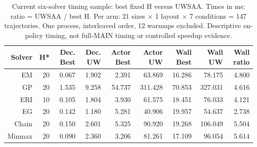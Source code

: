 \begin{table}[t]
\centering\scriptsize
\caption{Current six-solver timing sample: best fixed H versus UWSAA. Times in ms; ratio = UWSAA / best H. Per arm: 21 sizes $\times$ 1 layout $\times$ 7 conditions = 147 trajectories. One process, interleaved order, 12 warmups excluded. Descriptive on-policy timing, not full-MAIN timing or controlled speedup evidence.}
\setlength{\tabcolsep}{4pt}
\begin{tabular}{rrrrrrrrr}
\toprule
Solver & H* & Dec. Best & Dec. UW & Actor Best & Actor UW & Wall Best & Wall UW & Wall ratio \\
\midrule
EM & 20 & 0.067 & 1.902 & 2.391 & 63.869 & 16.286 & 78.175 & 4.800 \\
GP & 20 & 1.535 & 9.258 & 54.737 & 311.428 & 70.853 & 327.031 & 4.616 \\
ERI & 10 & 0.105 & 1.804 & 3.930 & 61.575 & 18.451 & 76.033 & 4.121 \\
EG & 20 & 0.142 & 1.180 & 5.281 & 40.906 & 19.957 & 54.637 & 2.738 \\
Chain & 20 & 0.150 & 2.601 & 5.325 & 90.920 & 19.268 & 106.049 & 5.504 \\
Minmax & 20 & 0.090 & 2.360 & 3.206 & 81.261 & 17.109 & 96.054 & 5.614 \\
\bottomrule
\end{tabular}
\end{table}